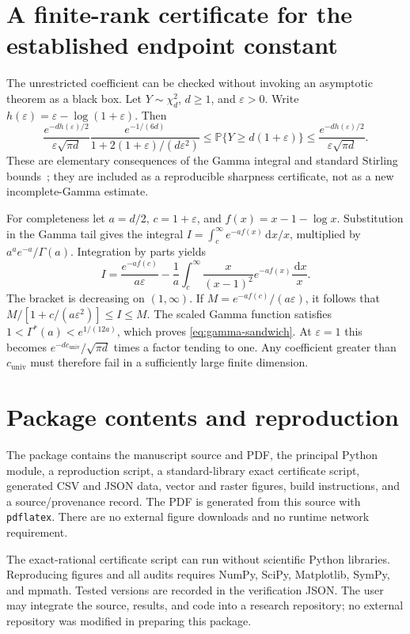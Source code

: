 \documentclass[11pt,letterpaper]{article}
\numberwithin{equation}{section}
\theoremstyle{definition}\newtheorem{definition}[theorem]{Definition}
\theoremstyle{remark}\newtheorem{remark}[theorem]{Remark}
\newcommand{\PP}{\mathbb P}
\newcommand{\dd}{\,\mathrm d}
\newcommand{\cstar}{c_{\mathrm{univ}}}
\begin{document}
\section{A finite-rank certificate for the established endpoint constant}
\label{app:gamma}
The unrestricted coefficient can be checked without invoking an
asymptotic theorem as a black box. Let $Y\sim\chi^2_d$, $d\ge1$,
and $\varepsilon>0$. Write $h(\varepsilon)=\varepsilon-\log(1+\varepsilon)$.
Then
\begin{equation}\label{eq:gamma-sandwich}
 \frac{e^{-dh(\varepsilon)/2}}{\varepsilon\sqrt{\pi d}}
 \frac{e^{-1/(6d)}}{1+2(1+\varepsilon)/(d\varepsilon^2)}
 \le\PP\{Y\ge d(1+\varepsilon)\}
 \le\frac{e^{-dh(\varepsilon)/2}}{\varepsilon\sqrt{\pi d}}.
\end{equation}
These are elementary consequences of the Gamma integral and standard
Stirling bounds~\cite{DLMF}; they are included as a reproducible
sharpness certificate, not as a new incomplete-Gamma estimate.

For completeness let $a=d/2$, $c=1+\varepsilon$, and
$f(x)=x-1-\log x$. Substitution in the Gamma tail gives the
integral $I=\int_c^\infty e^{-af(x)}\dd x/x$, multiplied by
$a^ae^{-a}/\Gamma(a)$. Integration by parts yields
\[
 I=\frac{e^{-af(c)}}{a\varepsilon}
 -\frac1a\int_c^\infty\frac{x}{(x-1)^2}
                         e^{-af(x)}\frac{\dd x}{x}.
\]
The bracket is decreasing on $(1,\infty)$. If
$M=e^{-af(c)}/(a\varepsilon)$, it follows that
$M/[1+c/(a\varepsilon^2)]\le I\le M$.
The scaled Gamma function satisfies
$1<\Gamma^*(a)<e^{1/(12a)}$, which proves
\eqref{eq:gamma-sandwich}. At $\varepsilon=1$ this becomes
$e^{-d\cstar}/\sqrt{\pi d}$ times a factor tending to one.
Any coefficient greater than $\cstar$ must therefore fail in a
sufficiently large finite dimension.

\section{Package contents and reproduction}
The package contains the manuscript source and PDF, the principal
Python module, a reproduction script, a standard-library exact
certificate script, generated CSV and JSON data, vector and raster
figures, build instructions, and a source/provenance record. The
PDF is generated from this source with \texttt{pdflatex}. There
are no external figure downloads and no runtime network requirement.

The exact-rational certificate script can run without scientific
Python libraries. Reproducing figures and all audits requires
NumPy, SciPy, Matplotlib, SymPy, and mpmath. Tested versions are
recorded in the verification JSON. The user may integrate the
source, results, and code into a research repository; no external
repository was modified in preparing this package.
\end{document}
